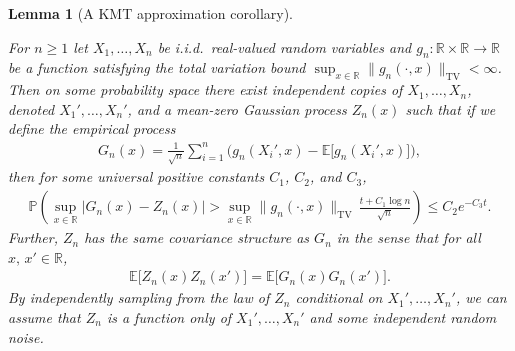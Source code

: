 \documentclass[11pt,lof]{puthesis}
\renewcommand{\P}{\ensuremath{\mathbb{P}}}
\newcommand{\R}{\ensuremath{\mathbb{R}}}
\newcommand{\E}{\ensuremath{\mathbb{E}}}
\newcommand{\TV}{\mathrm{TV}}
\theoremstyle{break}
\newtheorem{lemma}{Lemma}[section]
\theoremstyle{proof}
\begin{document}
\begin{lemma}[A KMT approximation corollary]
  \label{lem:kernel_app_kmt_corollary}

  For $n \geq 1$
  let $X_1, \ldots, X_n$
  be i.i.d.\ real-valued random variables and
  $g_n: \R \times \R \to \R$
  be a function satisfying
  the total variation bound
  $\sup_{x \in \R} \|g_n(\cdot, x)\|_\TV < \infty$.
  Then on some probability space
  there exist independent copies of
  $X_1, \ldots, X_n$,
  denoted $X_1', \ldots, X_n'$, and a mean-zero Gaussian process $Z_n(x)$ such
  that if we define the empirical process
  \begin{align*}
    G_n(x)
    = \frac{1}{\sqrt n} \sum_{i=1}^n
    \Big(g_n(X_i',x) - \E\big[g_n(X_i',x)\big]\Big),
  \end{align*}
  then for some universal positive constants $C_1$, $C_2$, and $C_3$,
  \begin{align*}
    \P\left(
      \sup_{x \in \R}
      \big|G_n(x) - Z_n(x)\big|
      > \sup_{x \in \R} \|g_n(\cdot, x)\|_\TV
      \, \frac{t + C_1 \log n}{\sqrt n}
    \right)
    \leq C_2 e^{-C_3 t}.
  \end{align*}
  Further, $Z_n$
  has the same covariance structure as $G_n$
  in the sense that for all $x,\, x' \in \R$,
  \begin{align*}
    \E\big[Z_n(x) Z_n(x')\big]
    = \E\big[G_n(x) G_n(x')\big].
  \end{align*}
  By independently sampling from the law of
  $Z_n$ conditional on $X_1', \ldots, X_n'$,
  we can assume that
  $Z_n$ is a function only of $X_1', \ldots, X_n'$
  and some independent random noise.

\end{lemma}
\end{document}
